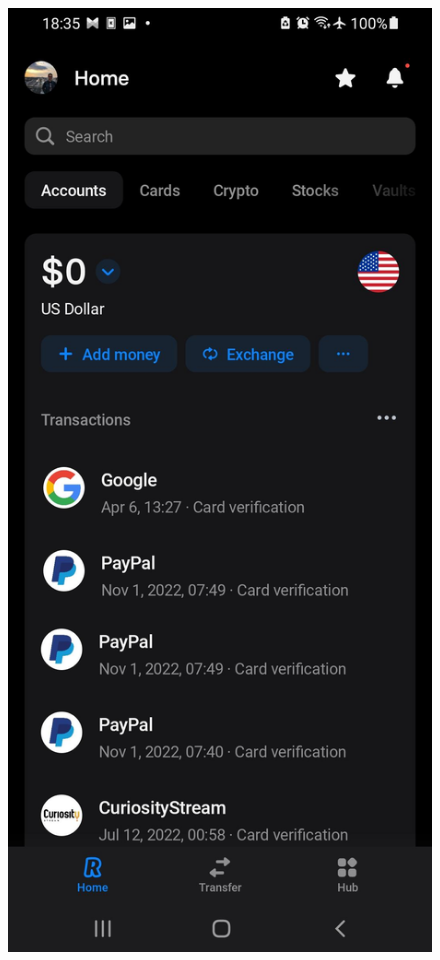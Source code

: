 \begin{figure}[htbp]
  \centering
  \begin{minipage}[b]{0.27\textwidth}
    \includegraphics[width=\textwidth]{Screen Shots/Revolut/D_Revolut.jpg}

\end{minipage}
\end{figure}
